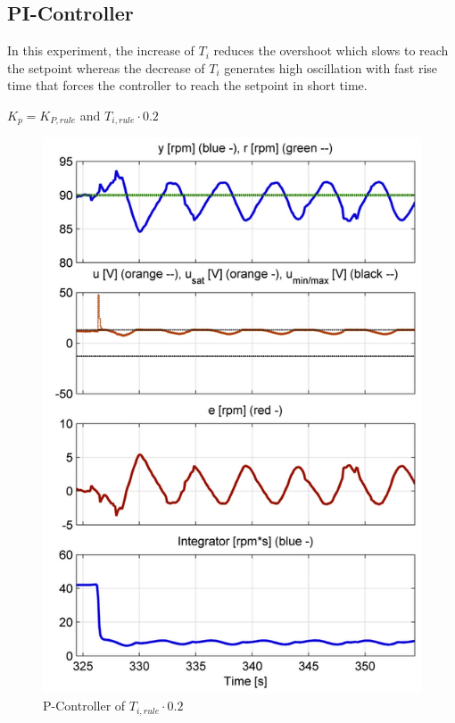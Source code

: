 \subsection{PI-Controller}
In this experiment, the increase of $ T_{i}$ reduces the overshoot  which slows to reach the setpoint whereas the decrease of $ T_{i}$ generates high oscillation with fast rise time that forces the controller to reach the setpoint in short time.
\begin{center}
{$K_{p}= K_{P,rule}$ and $ T_{i,rule}\cdot0.2$}
\end{center} 
\begin{figure}[H]
\begin{center}
\includegraphics[width=0.6\linewidth]{images/general//PI/PI_Controller02}
\end{center}
\caption{P-Controller of $ T_{i,rule}\cdot{0.2}$}
\label{fig:PI_Controller02}
\end{figure}

